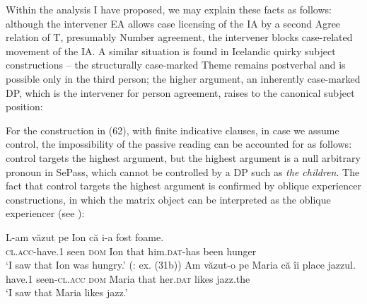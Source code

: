 \documentclass[output=paper]{langsci/langscibook}
\begin{document}
Within the analysis I have proposed, we may explain these facts as follows: although the intervener EA allows case licensing of the IA by a second Agree relation of T, presumably Number agreement, the intervener blocks case-related movement of the IA. A similar situation is found in Icelandic quirky subject constructions – the structurally case-marked Theme remains postverbal and is possible only in the third\textsuperscript{} person; the higher argument, an inherently case-marked DP, which is the intervener for person agreement, raises to the canonical subject position:

\judgewidth{*}
\ea%
    \label{ex:giurgea:65}
    \z
\z    

For the construction in (62), with finite indicative clauses, in case we assume control, the impossibility of the passive reading can be accounted for as follows: control targets the highest argument, but the highest argument is a null arbitrary pronoun in SePass, which cannot be controlled by a DP such as \textit{the children}. The fact that control targets the highest argument is confirmed by oblique experiencer constructions, in which the matrix object can be interpreted as the oblique experiencer (see \citealt{Alboiu2016}):

\ea%
    \label{ex:giurgea:66}
    \ea
    \gll L-am                văzut  pe Ion    că    i-a                 fost foame.   \\
         \textsc{cl.acc-}have.\textsc{1} seen   \textsc{dom} Ion that him.\textsc{dat-}has been hunger\\
    \glt ‘I saw that Ion was hungry.’ (\citealt{Alboiu2016}: ex. (31b))
    \ex
    \gll Am    văzut-o          pe     Maria că    îi           place jazzul.\\
          have.\textsc{1} seen{}-\textsc{cl.acc} \textsc{dom}  Maria that her.\textsc{dat} likes  jazz.the \\
    \glt ‘I saw that Maria likes jazz.’
    \z
\z    
\end{document}
